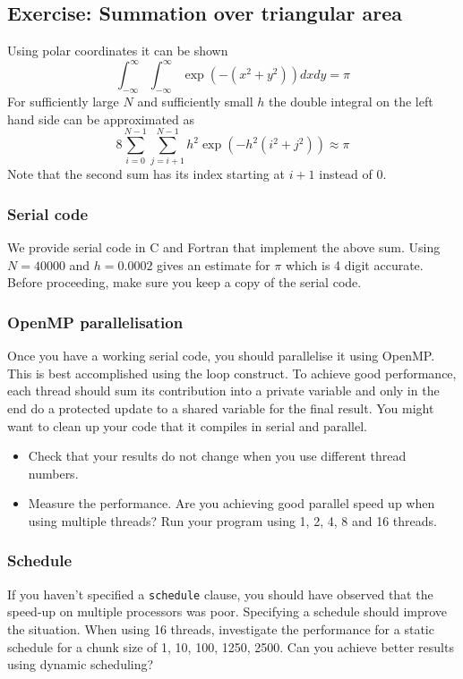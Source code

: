 \subsection{Exercise: Summation over triangular area}\label{triangularSumExercise}

Using polar coordinates it can be shown
\begin{equation}
\int_{-\infty}^\infty \int_{-\infty}^\infty \exp(-(x^2 +y^2)) dx dy = \pi
\end{equation}
For sufficiently large $N$ and sufficiently small $h$ the double integral on the left hand side can be approximated as
\begin{equation}
8\sum_{i=0}^{N-1}\sum_{j=i+1}^{N-1}
h^2 \exp\left(-h^2 (i^2 + j^2)
\right) \approx \pi
\end{equation}
Note that the second sum has its index starting at $i+1$ instead of 0.

\subsubsection{Serial code}\label{triangularSumExercise_serial}
We provide serial code in C and Fortran that implement the above sum.
Using $N=40000$ and $h=0.0002$ gives an estimate for $\pi$ which is 4 digit accurate.  Before proceeding, make sure you keep a copy of the serial code.

\subsubsection{OpenMP parallelisation}
Once you have a working serial code, you should parallelise it using OpenMP.   This is best accomplished using the loop construct.  To achieve good performance, each thread should sum its contribution into a private variable and only in the end do a protected update to a shared variable for the final result. You might want to clean up your code that it compiles in serial and parallel.
\begin{itemize}
\item Check that your results do not change when you use different thread numbers.
\item Measure the performance.  Are you achieving good parallel speed up when using multiple threads?  Run your program using 1, 2, 4, 8 and 16 threads.
\end{itemize}

\subsubsection{Schedule}
If you haven't specified a \verb+schedule+ clause, you should have observed that the speed-up on multiple processors was poor.  Specifying a schedule should improve the situation.  When using 16 threads, investigate the performance for a static schedule for a chunk size of 1, 10, 100, 1250, 2500.  Can you achieve better results using dynamic scheduling?

